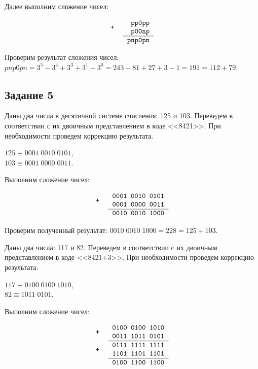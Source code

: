 \documentclass[a4paper,14pt]{extarticle}
\begin{document}
  Далее выполним сложение чисел:

  \[
  \begin{tabular}{{c}{c}}
    \texttt{+} &
    \begin{tabular}{c}
      \texttt{~pp0pp}\\
      \texttt{~p00np}\\
      \hline
    \end{tabular}\\
    & \texttt{pnp0pn}
  \end{tabular}
  \]

  Проверим результат сложения чисел:\\
  $pnp0pn=3^5-3^4+3^3+3^1-3^0=243-81+27+3-1=191=112+79$.

  \subsection*{Задание 5}
  Даны два числа в десятичной системе счисления: 125 и 103. Переведем в соответствии с их двоичным представлением в коде <<8421>>. При необходимости проведем коррекцию результата.

  $125 \equiv 0001\;0010\;0101$,\\
  \indent $103 \equiv 0001\;0000\;0011$.

  Выполним сложение чисел:

  \[
  \begin{tabular}{{c}{c}}
    \texttt{+} &
    \begin{tabular}{c}
      \texttt{0001~0010~0101}\\
      \texttt{0001~0000~0011}\\
      \hline
    \end{tabular}\\
    & \texttt{0010~0010~1000}
  \end{tabular}
  \]

  Проверим полученный результат: $0010\;0010\;1000=228=125+103$.

  Даны два числа: 117 и 82. Переведем в соответствии с их двоичным представлением в коде <<8421+3>>. При необходимости проведем коррекцию результата.

  $117 \equiv 0100\;0100\;1010$,\\
  \indent $82 \equiv 1011\;0101$.

  Выполним сложение чисел:

  \[
  \begin{tabular}{{c}{c}}
    \texttt{+} &
    \begin{tabular}{c}
      \texttt{0100~0100~1010}\\
      \texttt{0011~1011~0101}\\
      \hline
    \end{tabular}\\
    \texttt{+} &
    \begin{tabular}{c}
      \texttt{0111~1111~1111}\\
      \texttt{1101~1101~1101}\\
      \hline
    \end{tabular}\\
    & \texttt{0100~1100~1100}
  \end{tabular}
  \]
\end{document}
